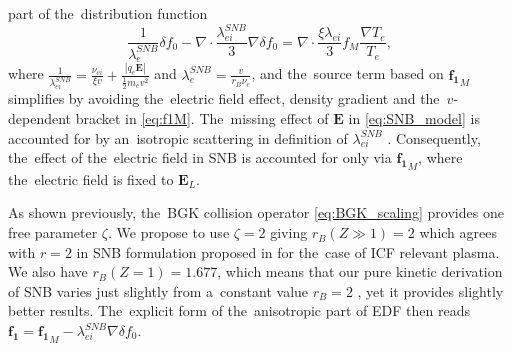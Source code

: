 \documentclass[
 aps,
 jmp,
 amsmath,amssymb,
 twocolumn,
]{revtex4-1}
\newcommand{\vect}[1]{\boldsymbol{#1}}
\newcommand{\mfpe}{\lambda_e}
\newcommand{\mfpei}{\lambda_{ei}}
\newcommand{\Zbar}{Z}
\newcommand{\nue}{\nu_{e}}
\newcommand{\nuei}{\nu_{ei}}
\newcommand{\vmag}{v}
\newcommand{\E}{\vect{E}}
\newcommand{\qe}{q_e}
\newcommand{\me}{m_e}
\newcommand{\Te}{T_e}
\newcommand{\fM}{f_M}
\newcommand{\fzero}{f_0}
\newcommand{\fone}{{\vect{f_1}}}
\begin{document}
part of the~distribution function
\begin{equation}
  \frac{1}{\mfpe^{SNB}}\delta\fzero 
  - \nabla\cdot\frac{\mfpei^{SNB}}{3}\nabla\delta\fzero =
  \nabla\cdot\frac{\xi\mfpei}{3}\fM\frac{\nabla \Te}{\Te}
  ,
  \label{eq:SNB_model}
\end{equation}
where $\frac{1}{\mfpei^{SNB}} = 
\frac{\nuei}{\xi\vmag} + \frac{|\qe\E|}{\frac{1}{2}\me\vmag^2}$ 
and $\mfpe^{SNB} = \frac{\vmag}{r_B \nue}$, and the~source term based on 
$\fone_M$ simplifies by avoiding the~electric field effect, density gradient 
and the~$\vmag$-dependent bracket in \eqref{eq:f1M}. The~missing
effect of $\E$ in \eqref{eq:SNB_model} is accounted for by 
an~isotropic scattering in definition of $\mfpei^{SNB}$ \cite{Schurtz_2000}.
Consequently, the~effect of the~electric field in SNB
is accounted for only via $\fone_M$, where the~electric field is
fixed to $\E_L$. 

As shown previously, the~BGK collision operator \eqref{eq:BGK_scaling}
provides one free parameter $\zeta$.
We propose to use $\zeta = 2$ giving $r_B(\Zbar\gg1) = 2$ which agrees 
with $r=2$ in SNB formulation proposed in \cite{Brodrick_PoP2017} 
for the~case of ICF relevant plasma. We also have $r_B(\Zbar = 1) = 1.677$,
which means that our pure kinetic derivation of SNB varies just slightly
from a~constant value $r_B=2$ \cite{Brodrick_PoP2017}, yet it provides 
slightly better results. The~explicit form of the~anisotropic 
part of EDF then reads $\fone = \fone_M - \mfpei^{SNB}\nabla\delta\fzero$.
\end{document}
